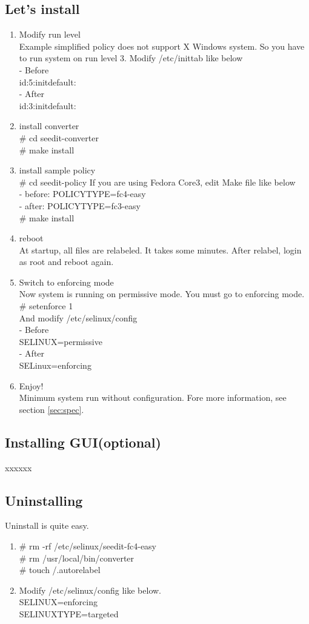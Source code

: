 \subsection{Let's install}
\begin{enumerate}
 \item  Modify run level\\
Example simplified policy does not support X Windows system.
So you have to run system on run level 3.
Modify /etc/inittab like below\\
- Before\\
id:5:initdefault:\\
- After\\
id:3:initdefault:
 \item  install converter\\
\# cd seedit-converter\\
\# make install

 \item install sample policy\\
\# cd seedit-policy
If you are using Fedora Core3, 
edit Make file like below\\
- before: POLICYTYPE=fc4-easy\\
- after: POLICYTYPE=fc3-easy\\
\# make install
 \item reboot\\
At startup, all files are relabeled. It takes some minutes.
After relabel, login as root and reboot again.
\item Switch to enforcing mode\\
Now system is running on permissive mode. You must go to enforcing
	mode. \\
\# setenforce 1\\
And modify /etc/selinux/config\\
- Before\\
SELINUX=permissive\\
- After\\
SELinux=enforcing\\
 \item Enjoy!\\
Minimum system run without configuration. Fore more information, see section
		\ref{sec:spec}.
\end{enumerate}

\subsection{Installing GUI(optional)}
xxxxxx

\subsection{Uninstalling}
Uninstall is quite easy.
\begin{enumerate}
 \item 
\# rm -rf /etc/selinux/seedit-fc4-easy\\
\# rm  /usr/local/bin/converter\\
\# touch /.autorelabel
\item  Modify /etc/selinux/config like below.\\
SELINUX=enforcing\\
SELINUXTYPE=targeted
\end{enumerate}